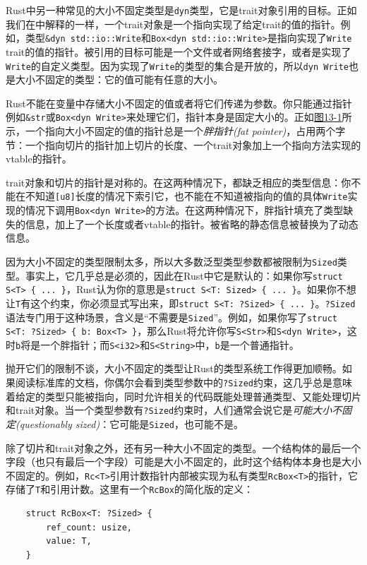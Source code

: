 Rust中另一种常见的大小不固定类型是\texttt{dyn}类型，它是trait对象引用的目标。正如我们在中解释的一样，一个trait对象是一个指向实现了给定trait的值的指针。例如，类型\texttt{\&dyn std::io::Write}和\texttt{Box<dyn std::io::Write>}是指向实现了\texttt{Write} trait的值的指针。被引用的目标可能是一个文件或者网络套接字，或者是实现了\texttt{Write}的自定义类型。因为实现了\texttt{Write}的类型的集合是开放的，所以\texttt{dyn Write}也是大小不固定的类型：它的值可能有任意的大小。

Rust不能在变量中存储大小不固定的值或者将它们传递为参数。你只能通过指针例如\texttt{\&str}或\texttt{Box<dyn Write>}来处理它们，指针本身是固定大小的。正如\hyperref[f13-1]{图13-1}所示，一个指向大小不固定的值的指针总是一个\emph{胖指针(fat pointer)}，占用两个字节：一个指向切片的指针加上切片的长度、一个trait对象加上一个指向方法实现的vtable的指针。

trait对象和切片的指针是对称的。在这两种情况下，都缺乏相应的类型信息：你不能在不知道\texttt{[u8]}长度的情况下索引它，也不能在不知道被指向的值的具体\texttt{Write}实现的情况下调用\texttt{Box<dyn Write>}的方法。在这两种情况下，胖指针填充了类型缺失的信息，加上了一个长度或者vtable的指针。被省略的静态信息被替换为了动态信息。

因为大小不固定的类型限制太多，所以大多数泛型类型参数都被限制为\texttt{Sized}类型。事实上，它几乎总是必须的，因此在Rust中它是默认的：如果你写\texttt{struct S<T> \{ ... \}}，Rust认为你的意思是\texttt{struct S<T: Sized> \{ ... \}}。如果你不想让\texttt{T}有这个约束，你必须显式写出来，即\texttt{struct S<T: ?Sized> \{ ... \}}。\texttt{?Sized}语法专门用于这种场景，含义是“不需要是\texttt{Sized}”。例如，如果你写了\texttt{struct S<T: ?Sized> \{ b: Box<T> \}}，那么Rust将允许你写\texttt{S<Str>}和\texttt{S<dyn Write>}，这时\texttt{b}将是一个胖指针；而\texttt{S<i32>}和\texttt{S<String>}中，\texttt{b}是一个普通指针。

抛开它们的限制不谈，大小不固定的类型让Rust的类型系统工作得更加顺畅。如果阅读标准库的文档，你偶尔会看到类型参数中的\texttt{?Sized}约束，这几乎总是意味着给定的类型只能被指向，同时允许相关的代码既能处理普通类型、又能处理切片和trait对象。当一个类型参数有\texttt{?Sized}约束时，人们通常会说它是\emph{可能大小不固定(questionably sized)}：它可能是\texttt{Sized}，也可能不是。

除了切片和trait对象之外，还有另一种大小不固定的类型。一个结构体的最后一个字段（也只有最后一个字段）可能是大小不固定的，此时这个结构体本身也是大小不固定的。例如，\texttt{Rc<T>}引用计数指针内部被实现为私有类型\texttt{RcBox<T>}的指针，它存储了\texttt{T}和引用计数。这里有一个\texttt{RcBox}的简化版的定义：
\begin{verbatim}
    struct RcBox<T: ?Sized> {
        ref_count: usize,
        value: T,
    }
\end{verbatim}

